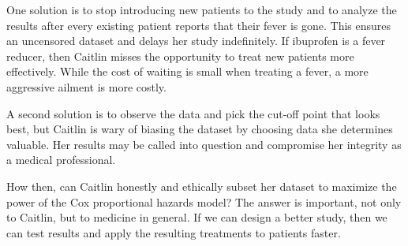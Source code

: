 One solution is to stop introducing new patients to the study and to analyze the results after every existing patient reports that their fever is gone. This ensures an uncensored dataset and delays her study indefinitely. If ibuprofen is a fever reducer, then Caitlin misses the opportunity to treat new patients more effectively. While the cost of waiting is small when treating a fever, a more aggressive ailment is more costly. 

A second solution is to observe the data and pick the cut-off point that looks best, but Caitlin is wary of biasing the dataset by choosing data she determines valuable. Her results may be called into question and compromise her integrity as a medical professional. 

How then, can Caitlin honestly and ethically subset her dataset to maximize the power of the Cox proportional hazards model? The answer is important, not only to Caitlin, but to medicine in general. If we can design a better study, then we can test results and apply the resulting treatments to patients faster. 

